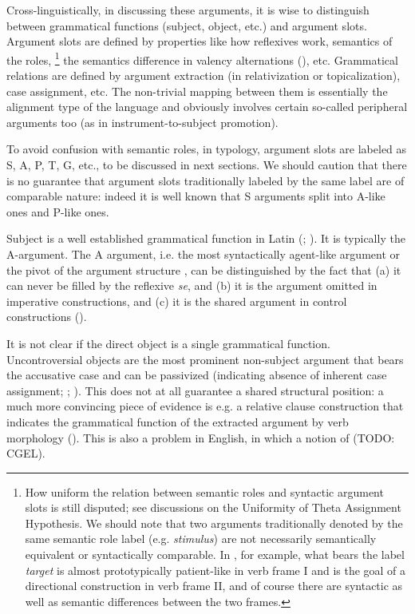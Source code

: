 \documentclass[a4paper, oneside, 12pt]{report}
\newcommand*{\citesec}[1]{\S~{#1}}
\newcommand*{\citepage}[1]{p.~{#1}}
\newcommand*{\citepages}[1]{pp.~{#1}}
\newcommand*{\term}[1]{\emph{#1}}
\newcommand{\form}[1]{\emph{#1}}
\begin{document}
Cross-linguistically, in discussing these arguments, 
it is wise to distinguish between grammatical functions (subject, object, etc.) and argument slots. 
Argument slots are defined by properties like  
how reflexives work, semantics of the roles,%
\footnote{
    How uniform the relation between semantic roles and syntactic argument slots is still disputed; see discussions on the Uniformity of Theta Assignment Hypothesis.
    We should note that two arguments traditionally denoted by the same semantic role label 
    (e.g. \term{stimulus})
    are not necessarily semantically equivalent or syntactically comparable.
    In \citet[\citesec{4.2}]{dixon2005semantic}, for example,
    what bears the label \term{target}
    is almost prototypically patient-like in verb frame I
    and is the goal of a directional construction in verb frame II,
    and of course there are syntactic as well as semantic differences between the two frames.
}
the semantics difference in valency alternations (), etc.
Grammatical relations are defined by argument extraction (in relativization or topicalization), case assignment, etc.
The non-trivial mapping between them is essentially the alignment type of the language
and obviously involves certain so-called peripheral arguments too (as in instrument-to-subject promotion).

To avoid confusion with semantic roles,
in typology, argument slots are labeled as S, A, P, T, G, etc.,
to be discussed in next sections.
We should caution that there is no guarantee that argument slots traditionally labeled by the same label are of comparable nature:
indeed it is well known that S arguments split into A-like ones and P-like ones.

Subject is a well established grammatical function in Latin (; \citealt[\citepage{28}]{Pinkster1}).
It is typically the A-argument.
The A argument, i.e. the most syntactically agent-like argument or the pivot of the argument structure \citep{aldridge2008generative}, can be distinguished by the fact that 
(a) it can never be filled by the reflexive \form{se}, and 
(b) it is the argument omitted in imperative constructions, and 
(c) it is the shared argument in control constructions ().

It is not clear if the direct object is a single grammatical function.
Uncontroversial objects are the most prominent non-subject argument that bears the accusative case and can be passivized (indicating absence of inherent case assignment; ; \citealt[\citepages{28-29}]{Pinkster1}).
This does not at all guarantee a shared structural position:
a much more convincing piece of evidence is e.g. a relative clause construction that indicates the grammatical function of the extracted argument by verb morphology (\citealt{jacques2016subjects}).
This is also a problem in English, in which a notion of  (TODO: CGEL).
\end{document}
